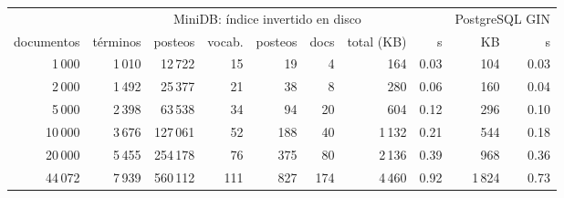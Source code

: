 \begin{tabular}{@{}rrrrrrrrrr@{}}
\toprule
 & \multicolumn{7}{c}{MiniDB: índice invertido en disco} & \multicolumn{2}{c}{PostgreSQL GIN} \\
\cmidrule(lr){2-8}\cmidrule(l){9-10}
documentos & términos & posteos & vocab. & posteos & docs & total (KB) & s & KB & s \\
\midrule
1\,000 & 1\,010 & 12\,722 & 15 & 19 & 4 & 164 & 0.03 & 104 & 0.03 \\
2\,000 & 1\,492 & 25\,377 & 21 & 38 & 8 & 280 & 0.06 & 160 & 0.04 \\
5\,000 & 2\,398 & 63\,538 & 34 & 94 & 20 & 604 & 0.12 & 296 & 0.10 \\
10\,000 & 3\,676 & 127\,061 & 52 & 188 & 40 & 1\,132 & 0.21 & 544 & 0.18 \\
20\,000 & 5\,455 & 254\,178 & 76 & 375 & 80 & 2\,136 & 0.39 & 968 & 0.36 \\
44\,072 & 7\,939 & 560\,112 & 111 & 827 & 174 & 4\,460 & 0.92 & 1\,824 & 0.73 \\
\bottomrule
\end{tabular}
